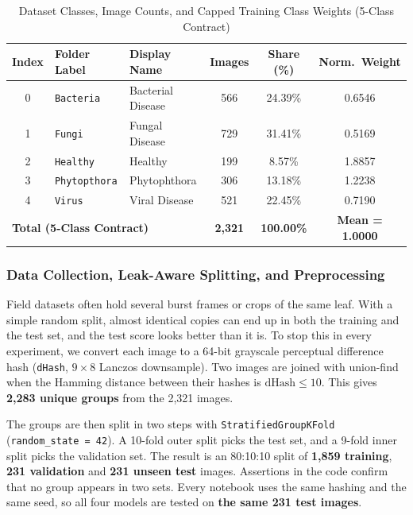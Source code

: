 \begin{table}[htbp]
\caption{Dataset Classes, Image Counts, and Capped Training Class Weights (5-Class Contract)}
\label{tab:class_dist}
\begin{center}
\begin{tabularx}{\textwidth}{| c | l | X | c | c | c |}
\hline
\textbf{Index} & \textbf{Folder Label} & \textbf{Display Name} & \textbf{Images} & \textbf{Share (\%)} & \textbf{Norm.\ Weight} \\
\hline
0 & \texttt{Bacteria} & Bacterial Disease & 566 & 24.39\% & 0.6546 \\
\hline
1 & \texttt{Fungi} & Fungal Disease & 729 & 31.41\% & 0.5169 \\
\hline
2 & \texttt{Healthy} & Healthy & 199 & 8.57\% & 1.8857 \\
\hline
3 & \texttt{Phytopthora} & Phytophthora & 306 & 13.18\% & 1.2238 \\
\hline
4 & \texttt{Virus} & Viral Disease & 521 & 22.45\% & 0.7190 \\
\hline
\multicolumn{3}{|l|}{\textbf{Total (5-Class Contract)}} & \textbf{2,321} & \textbf{100.00\%} & \textbf{Mean = 1.0000} \\
\hline
\end{tabularx}
\end{center}
\end{table}

\subsubsection{Data Collection, Leak-Aware Splitting, and Preprocessing}
Field datasets often hold several burst frames or crops of the same leaf. With a simple random split, almost identical copies can end up in both the training and the test set, and the test score looks better than it is. To stop this in every experiment, we convert each image to a 64-bit grayscale perceptual difference hash (\texttt{dHash}, $9 \times 8$ Lanczos downsample). Two images are joined with union-find when the Hamming distance between their hashes is $\text{dHash} \le 10$. This gives \textbf{2,283 unique groups} from the 2,321 images.

The groups are then split in two steps with \texttt{StratifiedGroupKFold} (\texttt{random\_state = 42}). A 10-fold outer split picks the test set, and a 9-fold inner split picks the validation set. The result is an 80:10:10 split of \textbf{1,859 training}, \textbf{231 validation} and \textbf{231 unseen test} images. Assertions in the code confirm that no group appears in two sets. Every notebook uses the same hashing and the same seed, so all four models are tested on \textbf{the same 231 test images}.

